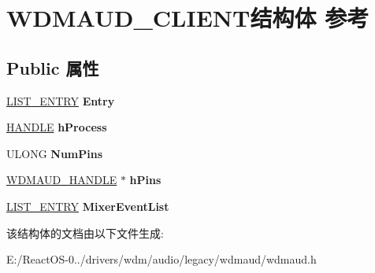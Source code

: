 \hypertarget{struct_w_d_m_a_u_d___c_l_i_e_n_t}{}\section{W\+D\+M\+A\+U\+D\+\_\+\+C\+L\+I\+E\+N\+T结构体 参考}
\label{struct_w_d_m_a_u_d___c_l_i_e_n_t}
\subsection*{Public 属性}
\begin{DoxyCompactItemize}
\item 
\mbox{\label{struct_w_d_m_a_u_d___c_l_i_e_n_t_a71a0971ed3b074319b34f83acffd6a29}} 
\hyperlink{struct___l_i_s_t___e_n_t_r_y}{L\+I\+S\+T\+\_\+\+E\+N\+T\+RY} {\bfseries Entry}
\item 
\mbox{\label{struct_w_d_m_a_u_d___c_l_i_e_n_t_aedff69634ecf219c1ddcdaa2f7afefd4}} 
\hyperlink{interfacevoid}{H\+A\+N\+D\+LE} {\bfseries h\+Process}
\item 
\mbox{\label{struct_w_d_m_a_u_d___c_l_i_e_n_t_a3182349339ee8947c69ab644b9d5af86}} 
U\+L\+O\+NG {\bfseries Num\+Pins}
\item 
\mbox{\label{struct_w_d_m_a_u_d___c_l_i_e_n_t_a29d09779d38ce46c1933e6bddd68a9ce}} 
\hyperlink{struct_w_d_m_a_u_d___h_a_n_d_l_e}{W\+D\+M\+A\+U\+D\+\_\+\+H\+A\+N\+D\+LE} $\ast$ {\bfseries h\+Pins}
\item 
\mbox{\label{struct_w_d_m_a_u_d___c_l_i_e_n_t_a2c00a118ff97b916dd3df3ffa920c57e}} 
\hyperlink{struct___l_i_s_t___e_n_t_r_y}{L\+I\+S\+T\+\_\+\+E\+N\+T\+RY} {\bfseries Mixer\+Event\+List}
\end{DoxyCompactItemize}


该结构体的文档由以下文件生成\+:\begin{DoxyCompactItemize}
\item 
E\+:/\+React\+O\+S-\/0../drivers/wdm/audio/legacy/wdmaud/wdmaud.\+h\end{DoxyCompactItemize}
